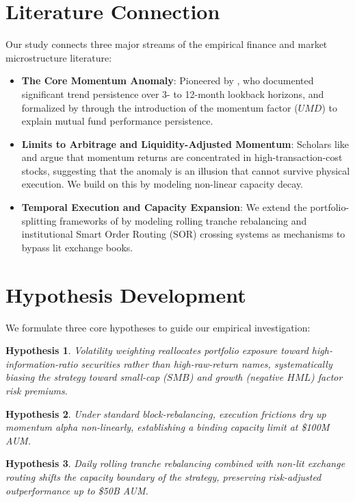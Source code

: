 \documentclass[12pt]{article}
\numberwithin{equation}{section}
\begin{document}
\section{Literature Connection}
Our study connects three major streams of the empirical finance and market microstructure literature:
\begin{itemize}
    \item \textbf{The Core Momentum Anomaly}: Pioneered by \citet{jegadeesh1993returns}, who documented significant trend persistence over 3- to 12-month lookback horizons, and formalized by \citet{carhart1997persistence} through the introduction of the momentum factor ($UMD$) to explain mutual fund performance persistence.
    \item \textbf{Limits to Arbitrage and Liquidity-Adjusted Momentum}: Scholars like \citet{lesmond2004transaction} and \citet{novy2012other} argue that momentum returns are concentrated in high-transaction-cost stocks, suggesting that the anomaly is an illusion that cannot survive physical execution. We build on this by modeling non-linear capacity decay.
    \item \textbf{Temporal Execution and Capacity Expansion}: We extend the portfolio-splitting frameworks of \citet{garleanu2013dynamic} by modeling rolling tranche rebalancing and institutional Smart Order Routing (SOR) crossing systems as mechanisms to bypass lit exchange books.
\end{itemize}

\section{Hypothesis Development}
We formulate three core hypotheses to guide our empirical investigation:
\newtheorem{hypothesis}{Hypothesis}
\begin{hypothesis}
Volatility weighting reallocates portfolio exposure toward high-information-ratio securities rather than high-raw-return names, systematically biasing the strategy toward small-cap ($SMB$) and growth (negative $HML$) factor risk premiums.
\end{hypothesis}
\begin{hypothesis}
Under standard block-rebalancing, execution frictions dry up momentum alpha non-linearly, establishing a binding capacity limit at \$100M AUM.
\end{hypothesis}
\begin{hypothesis}
Daily rolling tranche rebalancing combined with non-lit exchange routing shifts the capacity boundary of the strategy, preserving risk-adjusted outperformance up to \$50B AUM.
\end{hypothesis}
\end{document}
